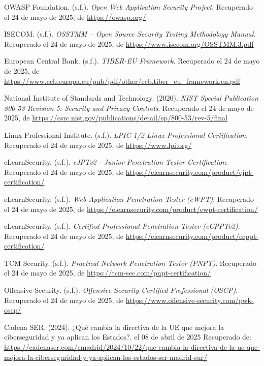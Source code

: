 \documentclass[a4paper, 10pt]{article}
\begin{document}
\begin{thebibliography}{20}
OWASP Foundation. (s.f.). \textit{Open Web Application Security Project}. Recuperado el 24 de mayo de 2025, de \url{https://owasp.org/}

ISECOM. (s.f.). \textit{OSSTMM – Open Source Security Testing Methodology Manual}. Recuperado el 24 de mayo de 2025, de \url{https://www.isecom.org/OSSTMM.3.pdf}

European Central Bank. (s.f.). \textit{TIBER-EU Framework}. Recuperado el 24 de mayo de 2025, de \url{https://www.ecb.europa.eu/pub/pdf/other/ecb.tiber_eu_framework.en.pdf}

National Institute of Standards and Technology. (2020). \textit{NIST Special Publication 800-53 Revision 5: Security and Privacy Controls}. Recuperado el 24 de mayo de 2025, de \url{https://csrc.nist.gov/publications/detail/sp/800-53/rev-5/final}

Linux Professional Institute. (s.f.). \textit{LPIC-1/2 Linux Professional Certification}. Recuperado el 24 de mayo de 2025, de \url{https://www.lpi.org/}

eLearnSecurity. (s.f.). \textit{eJPTv2 - Junior Penetration Tester Certification}. Recuperado el 24 de mayo de 2025, de \url{https://elearnsecurity.com/product/ejpt-certification/}

eLearnSecurity. (s.f.). \textit{Web Application Penetration Tester (eWPT)}. Recuperado el 24 de mayo de 2025, de \url{https://elearnsecurity.com/product/ewpt-certification/}

eLearnSecurity. (s.f.). \textit{Certified Professional Penetration Tester (eCPPTv2)}. Recuperado el 24 de mayo de 2025, de \url{https://elearnsecurity.com/product/ecppt-certification/}

TCM Security. (s.f.). \textit{Practical Network Penetration Tester (PNPT)}. Recuperado el 24 de mayo de 2025, de \url{https://tcm-sec.com/pnpt-certification/}

Offensive Security. (s.f.). \textit{Offensive Security Certified Professional (OSCP)}. Recuperado el 24 de mayo de 2025, de \url{https://www.offensive-security.com/pwk-oscp/}


    Cadena SER. (2024). ¿Qué cambia la directiva de la UE que mejora la ciberseguridad y ya aplican los Estados?. el 08 de abril de 2025 Recuperado de: \url{https://cadenaser.com/cmadrid/2024/10/22/que-cambia-la-directiva-de-la-ue-que-mejora-la-ciberseguridad-y-ya-aplican-los-estados-ser-madrid-sur/}


\end{thebibliography}
\end{document}
